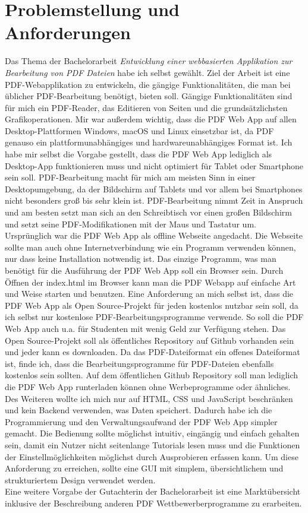 \section{Problemstellung und Anforderungen}
Das Thema der Bachelorarbeit \textit{\glqq Entwicklung einer webbasierten Applikation zur Bearbeitung von PDF Dateien\grqq} habe ich selbst gewählt. Ziel der Arbeit ist eine PDF-Webapplikation zu entwickeln, die gängige Funktionalitäten, die man bei üblicher PDF-Bearbeitung benötigt, bieten soll. Gängige Funktionalitäten sind für mich ein PDF-Reader, das Editieren von Seiten und die grundsätzlichsten Grafikoperationen. Mir war außerdem wichtig, dass die PDF Web App auf allen Desktop-Plattformen Windows, macOS und Linux einsetzbar ist, da PDF genauso ein plattformunabhängiges und hardwareunabhängiges Format ist. Ich habe mir selbst die Vorgabe gestellt, dass die PDF Web App lediglich als Desktop-App funktionieren muss und nicht optimiert für Tablet oder Smartphone sein soll. PDF-Bearbeitung macht für mich am meisten Sinn in einer Desktopumgebung, da der Bildschirm auf Tablets und vor allem bei Smartphones nicht besonders groß bis sehr klein ist. PDF-Bearbeitung nimmt Zeit in Anspruch und am besten setzt man sich an den Schreibtisch vor einen großen Bildschirm und setzt seine PDF-Modifikationen mit der Maus und Tastatur um. \\
Ursprünglich war die PDF Web App als offline Webseite angedacht. Die Webseite sollte man auch ohne Internetverbindung wie ein Programm verwenden können, nur dass keine Installation notwendig ist. Das einzige Programm, was man benötigt für die Ausführung der PDF Web App soll ein Browser sein. Durch Öffnen der index.html im Browser kann man die PDF Webapp auf einfache Art und Weise starten und benutzen. Eine Anforderung an mich selbst ist, dass die PDF Web App als Open Source-Projekt für jeden kostenlos nutzbar sein soll, da ich selbst nur kostenlose PDF-Bearbeitungsprogramme verwende. So soll die PDF Web App auch u.a. für Studenten mit wenig Geld zur Verfügung stehen. Das Open Source-Projekt soll als öffentliches Repository auf Github vorhanden sein und jeder kann es downloaden. Da das PDF-Dateiformat ein offenes Dateiformat ist, finde ich, dass die Bearbeitungsprogramme für PDF-Dateien ebenfalls kostenlos sein sollten. Auf dem öffentlichen Github Repository soll man lediglich die PDF Web App runterladen können ohne Werbeprogramme oder ähnliches. \\
Des Weiteren wollte ich mich nur auf HTML, CSS und JavaScript beschränken und kein Backend verwenden, was Daten speichert. Dadurch habe ich die Programmierung und den Verwaltungsaufwand der PDF Web App simpler gemacht. Die Bedienung sollte möglichst intuitiv, eingängig und einfach gehalten sein, damit ein Nutzer nicht seitenlange Tutorials lesen muss und die Funktionen der Einstellmöglichkeiten möglichst durch Ausprobieren erfassen kann. Um diese Anforderung zu erreichen, sollte eine GUI mit simplem, übersichtlichem und strukturiertem Design verwendet werden. \\
Eine weitere Vorgabe der Gutachterin der Bachelorarbeit ist eine Marktübersicht inklusive der Beschreibung anderen PDF Wettbewerberprogramme zu erarbeiten. \\

